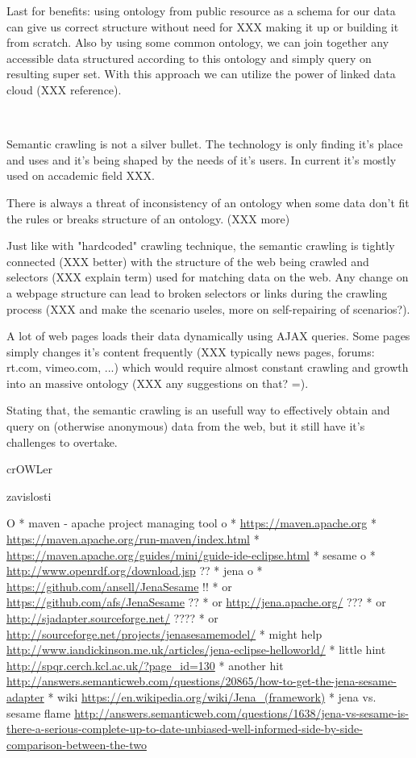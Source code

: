 Last for benefits: using ontology from public resource as a schema for our data
can give us correct structure without need for XXX making it up or building it
from scratch. Also by using some common ontology, we can join together any
accessible data structured according to this ontology and simply query on
resulting super set. With this approach we can utilize the power of linked data
cloud (XXX reference). 

~

Semantic crawling is not a silver bullet. The technology is only finding it's
place and uses and it's being shaped by the needs of it's users. In current
it's mostly used on accademic field XXX. 

There is always a threat of inconsistency of an ontology when some data don't
fit the rules or breaks structure of an ontology. (XXX more)

Just like with "hardcoded" crawling technique, the semantic crawling is tightly
connected (XXX better) with the structure of the web being crawled and
selectors (XXX explain term) used for matching data on the web. Any change on a
webpage structure can lead to broken selectors or links during the crawling
process (XXX and make the scenario useles, more on self-repairing of
scenarios?). 

A lot of web pages loads their data dynamically using AJAX queries. Some pages
simply changes it's content frequently (XXX typically news pages, forums: rt.com,
vimeo.com, ...) which would require almost constant crawling and growth into an
massive ontology (XXX any suggestions on that? =). 

Stating that, the semantic crawling is an usefull way to effectively obtain and
query on (otherwise anonymous) data from the web, but it still have it's challenges
to overtake. 


\sec crOWLer

\secc zavislosti

\begitems \style O
  * maven - apache project managing tool
  \begitems \style o
    * \url{https://maven.apache.org}
    * \url{https://maven.apache.org/run-maven/index.html}
    * \url{https://maven.apache.org/guides/mini/guide-ide-eclipse.html}
  \enditems
  * sesame
  \begitems \style o
    * \url{http://www.openrdf.org/download.jsp} ??
  \enditems
  * jena
  \begitems \style o
    * \url{https://github.com/ansell/JenaSesame} !!
    * or \url{https://github.com/afs/JenaSesame} ??
    * or \url{http://jena.apache.org/} ???
    * or \url{http://sjadapter.sourceforge.net/} ????
    * or \url{http://sourceforge.net/projects/jenasesamemodel/}
    * might help \url{http://www.iandickinson.me.uk/articles/jena-eclipse-helloworld/}
    * little hint \url{http://spqr.cerch.kcl.ac.uk/?page_id=130}
    * another hit \url{http://answers.semanticweb.com/questions/20865/how-to-get-the-jena-sesame-adapter}
    * wiki \url{https://en.wikipedia.org/wiki/Jena_(framework)}
    * jena vs. sesame flame \url{http://answers.semanticweb.com/questions/1638/jena-vs-sesame-is-there-a-serious-complete-up-to-date-unbiased-well-informed-side-by-side-comparison-between-the-two}
  \enditems
\enditems


